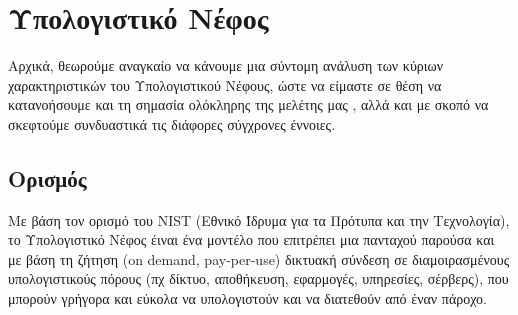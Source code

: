 \documentclass{article}
\begin{document}
\section{Υπολογιστικό Νέφος}
Αρχικά, θεωρούμε αναγκαίο να κάνουμε μια σύντομη ανάλυση των κύριων χαρακτηριστικών του Υπολογιστικού Νέφους, ώστε να είμαστε σε θέση να κατανοήσουμε και τη σημασία ολόκληρης της μελέτης μας , αλλά και με σκοπό να σκεφτούμε συνδυαστικά τις διάφορες σύγχρονες έννοιες.
\subsection{Ορισμός}
Με βάση τον ορισμό του NIST (Εθνικό Ίδρυμα για τα Πρότυπα και την Τεχνολογία), το Υπολογιστικό Νέφος έιναι ένα μοντέλο που επιτρέπει μια πανταχού παρούσα και με βάση τη ζήτηση (on demand, pay-per-use) δικτυακή σύνδεση σε διαμοιρασμένους υπολογιστικούς πόρους (πχ δίκτυο, αποθήκευση, εφαρμογές, υπηρεσίες, σέρβερς), που μπορούν γρήγορα και εύκολα να υπολογιστούν και να διατεθούν από έναν πάροχο.
\end{document}
